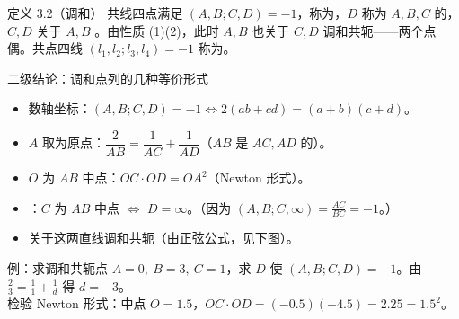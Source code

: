 \begin{defbox}{定义 3.2（调和）}
共线四点满足 $(A,B;C,D)=-1$，称为，$D$ 称为 $A,B,C$ 的，$C,D$ 关于 $A,B$ 。由性质 (1)(2)，此时 $A,B$ 也关于 $C,D$ 调和共轭——两个点偶。共点四线 $(l_1,l_2;l_3,l_4)=-1$ 称为。
\end{defbox}

\begin{thmbox}{二级结论：调和点列的几种等价形式}
\begin{itemize}
\item 数轴坐标：$(A,B;C,D)=-1\iff 2(ab+cd)=(a+b)(c+d)$。
\item $A$ 取为原点：$\dfrac{2}{AB}=\dfrac{1}{AC}+\dfrac{1}{AD}$（$AB$ 是 $AC,AD$ 的）。
\item $O$ 为 $AB$ 中点：$OC\cdot OD=OA^2$（Newton 形式）。
\item {}：$C$ 为 $AB$ 中点 $\iff$ $D=\infty$。（因为 $(A,B;C,\infty)=\frac{AC}{BC}=-1$。）
\item {}关于这两直线调和共轭（由正弦公式，见下图）。
\end{itemize}
\end{thmbox}

\begin{mtbox}{例：求调和共轭点}
$A=0,\ B=3,\ C=1$，求 $D$ 使 $(A,B;C,D)=-1$。\quad 由 $\frac{2}{3}=\frac11+\frac1d$ 得 $d=-3$。\\
检验 Newton 形式：中点 $O=1.5$，$OC\cdot OD=(-0.5)(-4.5)=2.25=1.5^2$。 \checkmark
\end{mtbox}

